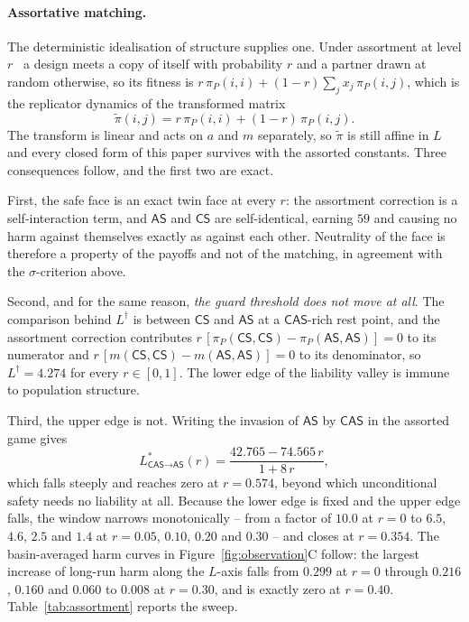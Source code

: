 \documentclass[11pt,a4paper]{article}
\theoremstyle{definition}
\newcommand{\AS}{\textsf{AS}}
\newcommand{\CS}{\textsf{CS}}
\newcommand{\CAS}{\textsf{CAS}}
\newcommand{\piP}{\pi_{P}}
\begin{document}
\paragraph{Assortative matching.}
The deterministic idealisation of structure supplies one. Under assortment at
level $r$~\citep{grafen1979hawk,eshel1982assortment,bergstrom2003algebra} a design meets a copy of
itself with probability $r$ and a partner drawn at random otherwise, so its
fitness is $r\,\piP(i,i)+(1-r)\sum_j x_j\,\piP(i,j)$, which is the replicator
dynamics of the transformed matrix
\begin{equation}
\tilde\pi(i,j)=r\,\piP(i,i)+(1-r)\,\piP(i,j).
\label{eq:assort}
\end{equation}
The transform is linear and acts on $a$ and $m$ separately, so $\tilde\pi$ is
still affine in $L$ and every closed form of this paper survives with the
assorted constants. Three consequences follow, and the first two are exact.

First, the safe face is an exact twin face at every $r$: the assortment
correction is a self-interaction term, and $\AS$ and $\CS$ are self-identical,
earning $59$ and causing no harm against themselves exactly as against each
other. Neutrality of the face is therefore a property of the payoffs and not
of the matching, in agreement with the $\sigma$-criterion above.

Second, and for the same reason, \emph{the guard threshold does not move at
all}. The comparison behind $L^{\dagger}$ is between $\CS$ and $\AS$ at a
$\CAS$-rich rest point, and the assortment correction contributes
$r\,[\piP(\CS,\CS)-\piP(\AS,\AS)]=0$ to its numerator and
$r\,[m(\CS,\CS)-m(\AS,\AS)]=0$ to its denominator, so $L^{\dagger}=4.274$ for
every $r\in[0,1]$. The lower edge of the liability valley is immune to
population structure.

Third, the upper edge is not. Writing the invasion of $\AS$ by $\CAS$ in the
assorted game gives
\begin{equation}
L^{*}_{\CAS\to\AS}(r)=\frac{42.765-74.565\,r}{1+8\,r},
\label{eq:assortupper}
\end{equation}
which falls steeply and reaches zero at $r=0.574$, beyond which unconditional
safety needs no liability at all. Because the lower edge is fixed and the
upper edge falls, the window narrows monotonically -- from a factor of $10.0$
at $r=0$ to $6.5$, $4.6$, $2.5$ and $1.4$ at $r=0.05$, $0.10$, $0.20$ and
$0.30$ -- and closes at $r=0.354$. The basin-averaged harm curves in
Figure~\ref{fig:observation}C follow: the largest increase of long-run harm
along the $L$-axis falls from $0.299$ at $r=0$ through $0.216$, $0.160$ and
$0.060$ to $0.008$ at $r=0.30$, and is exactly zero at $r=0.40$.
Table~\ref{tab:assortment} reports the sweep.
\end{document}
